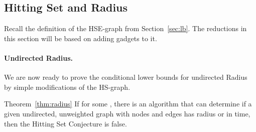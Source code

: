 

\subsection{Hitting Set and Radius }

Recall the definition of the HSE-graph from Section~\ref{sec:lb}. 
The reductions in this section will be based on adding gadgets to it.


\paragraph{Undirected Radius.} We are now ready to prove the conditional lower bounds for undirected Radius by simple modifications of the HS-graph.

\begin{reminder}{Theorem~\ref{thm:radius}}
If for some , there is an algorithm that can determine if a given undirected, unweighted graph with  nodes and  edges has radius  or  in  time, then the Hitting Set Conjecture is false.
\end{reminder}

